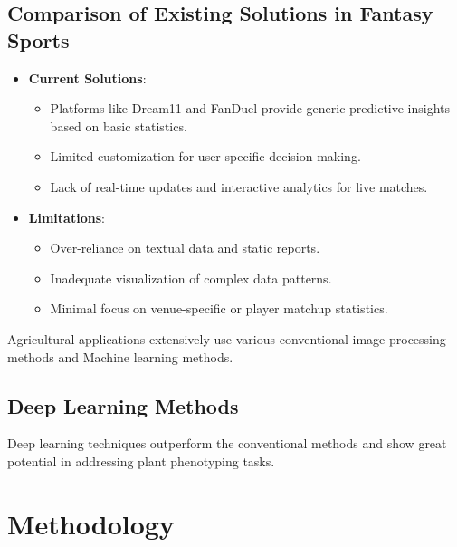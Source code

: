 \subsection{Comparison of Existing Solutions in Fantasy Sports}
\begin{itemize}
    \item \textbf{Current Solutions}:
    \begin{itemize}
        \item Platforms like Dream11 and FanDuel provide generic predictive insights based on basic statistics.
        \item Limited customization for user-specific decision-making.
        \item Lack of real-time updates and interactive analytics for live matches.
    \end{itemize}
    \item \textbf{Limitations}:
    \begin{itemize}
        \item Over-reliance on textual data and static reports.
        \item Inadequate visualization of complex data patterns.
        \item Minimal focus on venue-specific or player matchup statistics.
    \end{itemize}
\end{itemize}

Agricultural applications extensively use various conventional image processing methods and Machine learning methods.

\subsection{Deep Learning Methods}

Deep learning techniques outperform the conventional methods and show great potential in addressing plant phenotyping tasks. 

\section{Methodology}


